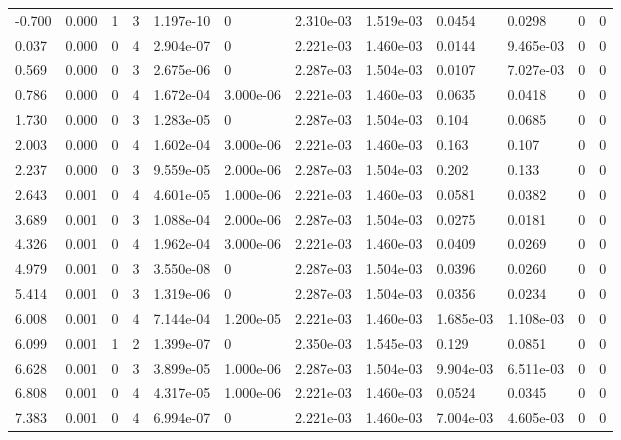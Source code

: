 \documentclass[preview]{standalone}
\begin{document}
{{\begin{tabular}{L{1.2cm}C{1.2cm} C{0.3cm}C{0.5cm} C{1.4cm}C{1.4cm} C{1.4cm}C{1.4cm} C{1.6cm}C{1.6cm} C{1.6cm}C{1.6cm}}
  -0.700  &  0.000  & 1     &  3 &  1.197e-10  & 0  &  2.310e-03&   1.519e-03& 0.0454 & 0.0298   &  0 & 0  \\ 
  0.037  &  0.000  & 0     &  4 &  2.904e-07  & 0  &  2.221e-03&   1.460e-03& 0.0144 & 9.465e-03   &  0 & 0  \\ 
  0.569  &  0.000  & 0     &  3 &  2.675e-06  & 0  &  2.287e-03&   1.504e-03& 0.0107 & 7.027e-03   &  0 & 0  \\ 
  0.786  &  0.000  & 0     &  4 &  1.672e-04  & 3.000e-06  &  2.221e-03&   1.460e-03& 0.0635 & 0.0418   &  0 & 0  \\ 
  1.730  &  0.000  & 0     &  3 &  1.283e-05  & 0  &  2.287e-03&   1.504e-03& 0.104 & 0.0685   &  0 & 0  \\ 
  2.003  &  0.000  & 0     &  4 &  1.602e-04  & 3.000e-06  &  2.221e-03&   1.460e-03& 0.163 & 0.107   &  0 & 0  \\ 
  2.237  &  0.000  & 0     &  3 &  9.559e-05  & 2.000e-06  &  2.287e-03&   1.504e-03& 0.202 & 0.133   &  0 & 0  \\ 
  2.643  &  0.001  & 0     &  4 &  4.601e-05  & 1.000e-06  &  2.221e-03&   1.460e-03& 0.0581 & 0.0382   &  0 & 0  \\ 
  3.689  &  0.001  & 0     &  3 &  1.088e-04  & 2.000e-06  &  2.287e-03&   1.504e-03& 0.0275 & 0.0181   &  0 & 0  \\ 
  4.326  &  0.001  & 0     &  4 &  1.962e-04  & 3.000e-06  &  2.221e-03&   1.460e-03& 0.0409 & 0.0269   &  0 & 0  \\ 
  4.979  &  0.001  & 0     &  3 &  3.550e-08  & 0  &  2.287e-03&   1.504e-03& 0.0396 & 0.0260   &  0 & 0  \\ 
  5.414  &  0.001  & 0     &  3 &  1.319e-06  & 0  &  2.287e-03&   1.504e-03& 0.0356 & 0.0234   &  0 & 0  \\ 
  6.008  &  0.001  & 0     &  4 &  7.144e-04  & 1.200e-05  &  2.221e-03&   1.460e-03& 1.685e-03 & 1.108e-03   &  0 & 0  \\ 
  6.099  &  0.001  & 1     &  2 &  1.399e-07  & 0  &  2.350e-03&   1.545e-03& 0.129 & 0.0851   &  0 & 0  \\ 
  6.628  &  0.001  & 0     &  3 &  3.899e-05  & 1.000e-06  &  2.287e-03&   1.504e-03& 9.904e-03 & 6.511e-03   &  0 & 0  \\ 
  6.808  &  0.001  & 0     &  4 &  4.317e-05  & 1.000e-06  &  2.221e-03&   1.460e-03& 0.0524 & 0.0345   &  0 & 0  \\ 
  7.383  &  0.001  & 0     &  4 &  6.994e-07  & 0  &  2.221e-03&   1.460e-03& 7.004e-03 & 4.605e-03   &  0 & 0  \\ 

\end{tabular}}}
\end{document}
